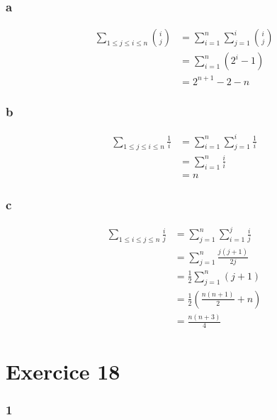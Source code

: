 \documentclass{report}
\begin{document}
\subsubsection*{a}
\begin{equation*}
	\begin{split}
		\sum_{1\le j \le i \le n} \binom{i}{j}
		&= \sum_{i=1}^{n} \sum_{j=1}^{i} \binom{i}{j} \\
		&= \sum_{i=1}^{n} (2^i -1)\\
		&= 2^{n+1} - 2 - n
	\end{split}
\end{equation*}

\subsubsection*{b}
\begin{equation*}
	\begin{split}
		\sum_{1\le j \le i \le n} \frac{1}{i}
		&= \sum_{i=1}^{n} \sum_{j=1}^{i} \frac{1}{i} \\
		&= \sum_{i=1}^{n} \frac{i}{i} \\
		&= n
	\end{split}
\end{equation*}

\subsubsection*{c}
\begin{equation*}
	\begin{split}
		\sum_{1\le i \le j \le n} \frac{i}{j}
		&= \sum_{j=1}^{n} \sum_{i=1}^{j} \frac{i}{j} \\
		&= \sum_{j=1}^{n} \frac{j(j+1)}{2j} \\
		&= \frac{1}{2}\sum_{j=1}^{n} (j+1) \\
		&= \frac{1}{2} \left(\frac{n(n+1)}{2} + n\right) \\
		&= \frac{n(n+3)}{4}
	\end{split}
\end{equation*}

\section*{Exercice 18}

\subsubsection*{1}
\end{document}
